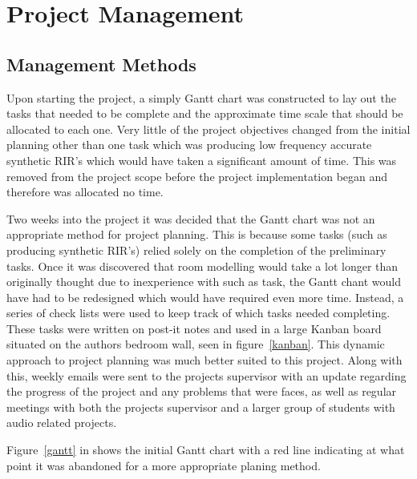 \documentclass[../../main.tex]{subfiles}
\begin{document}
\section{Project Management}
	\subsection{Management Methods}
	Upon starting the project, a simply Gantt chart was constructed to lay out the tasks that needed to be complete and the approximate time scale that should be allocated to each one. Very little of the project objectives changed from the initial planning other than one task which was producing low frequency accurate synthetic \ac{RIR}'s which would have taken a significant amount of time. This was removed from the project scope before the project implementation began and therefore was allocated no time.

	Two weeks into the project it was decided that the Gantt chart was not an appropriate method for project planning. This is because some tasks (such as producing synthetic \ac{RIR}'s) relied solely on the completion of the preliminary tasks. Once it was discovered that room modelling would take a lot longer than originally thought due to inexperience with such as task, the Gantt chant would have had to be redesigned which would have required even more time. Instead, a series of check lists were used to keep track of which tasks needed completing. These tasks were written on post-it notes and used in a large Kanban board situated on the authors bedroom wall, seen in figure~\ref{kanban}. This dynamic approach to project planning was much better suited to this project.  Along with this, weekly emails were sent to the projects supervisor with an update regarding the progress of the project and any problems that were faces, as well as regular meetings with both the projects supervisor and a larger group of students with audio related projects.

	Figure~\ref{gantt} in  shows the initial Gantt chart with a red line indicating at what point it was abandoned for a more appropriate planing method.
\end{document}
